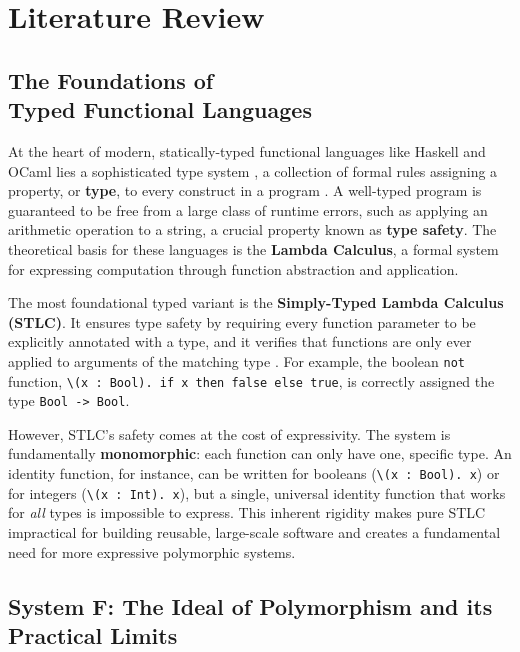 \chapter{Literature Review}
\label{chap:LiteratureReview}

\section{The Foundations of \\ Typed Functional Languages}
\label{sec:LitReviewFoundations}

At the heart of modern, statically-typed functional languages like Haskell and OCaml lies a sophisticated type system \cite{haskell-type-systems-research, ocaml-papers}, a collection of formal rules assigning a property, or \textbf{type}, to every construct in a program \cite{pierce-types-2002}. A well-typed program is guaranteed to be free from a large class of runtime errors, such as applying an arithmetic operation to a string, a crucial property known as \textbf{type safety}. The theoretical basis for these languages is the \textbf{Lambda Calculus}, a formal system for expressing computation through function abstraction and application.

The most foundational typed variant is the \textbf{Simply-Typed Lambda Calculus (STLC)}. It ensures type safety by requiring every function parameter to be explicitly annotated with a type, and it verifies that functions are only ever applied to arguments of the matching type \cite{Pierce-SF2}. For example, the boolean \texttt{not} function, \texttt{\textbackslash(x : Bool). if x then false else true}, is correctly assigned the type \texttt{Bool -> Bool}.

However, STLC's safety comes at the cost of expressivity. The system is fundamentally \textbf{monomorphic}: each function can only have one, specific type. An identity function, for instance, can be written for booleans (\texttt{\textbackslash(x~:~Bool).~x}) or for integers (\texttt{\textbackslash(x~:~Int).~x}), but a single, universal identity function that works for \textit{all} types is impossible to express. This inherent rigidity makes pure STLC impractical for building reusable, large-scale software and creates a fundamental need for more expressive polymorphic systems.

\section{System F: The Ideal of Polymorphism and its Practical Limits}
\label{chap:LiteratureReview:sec:PolymorphismAndSystemF}

